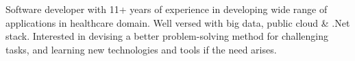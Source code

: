 \par{
Software developer with 11+ years of experience in developing wide range of applications in healthcare domain. Well versed with big data, public cloud \& .Net stack. Interested in devising a better problem-solving method for challenging tasks, and learning new technologies and tools if the need arises.
}